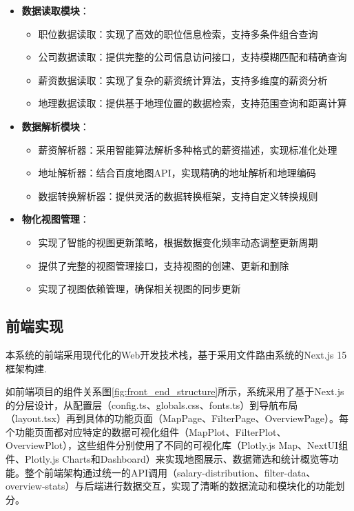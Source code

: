 \begin{itemize}
    \item \textbf{数据读取模块}：
    \begin{itemize}
        \item 职位数据读取：实现了高效的职位信息检索，支持多条件组合查询
        \item 公司数据读取：提供完整的公司信息访问接口，支持模糊匹配和精确查询
        \item 薪资数据读取：实现了复杂的薪资统计算法，支持多维度的薪资分析
        \item 地理数据读取：提供基于地理位置的数据检索，支持范围查询和距离计算
    \end{itemize}
    
    \item \textbf{数据解析模块}：
    \begin{itemize}
        \item 薪资解析器：采用智能算法解析多种格式的薪资描述，实现标准化处理
        \item 地址解析器：结合百度地图API，实现精确的地址解析和地理编码
        \item 数据转换解析器：提供灵活的数据转换框架，支持自定义转换规则
    \end{itemize}
    
    \item \textbf{物化视图管理}：
    \begin{itemize}
        \item 实现了智能的视图更新策略，根据数据变化频率动态调整更新周期
        \item 提供了完整的视图管理接口，支持视图的创建、更新和删除
        \item 实现了视图依赖管理，确保相关视图的同步更新
    \end{itemize}
\end{itemize}

\subsection{前端实现}

本系统的前端采用现代化的Web开发技术栈，基于采用文件路由系统的Next.js 15框架构建.


如前端项目的组件关系图\ref{fig:front_end_structure}所示，系统采用了基于Next.js的分层设计，从配置层（config.ts、globals.css、fonts.ts）到导航布局（layout.tsx）再到具体的功能页面（MapPage、FilterPage、OverviewPage）。每个功能页面都对应特定的数据可视化组件（MapPlot、FilterPlot、OverviewPlot），这些组件分别使用了不同的可视化库（Plotly.js Map、NextUI组件、Plotly.js Charts和Dashboard）来实现地图展示、数据筛选和统计概览等功能。整个前端架构通过统一的API调用（salary-distribution、filter-data、overview-stats）与后端进行数据交互，实现了清晰的数据流动和模块化的功能划分。

